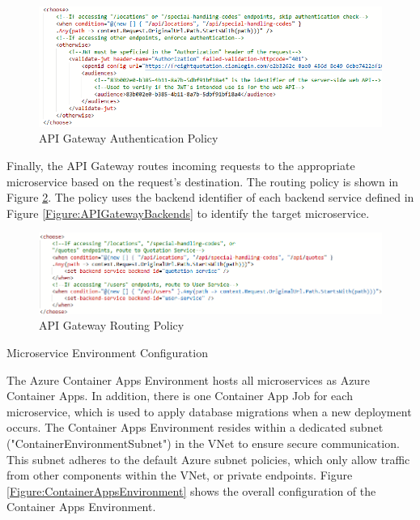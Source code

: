 \documentclass[12pt, reqno]{amsbook}
\makeatletter
\def\subsection{\@startsection{subsection}{2}%
      \z@{.5\linespacing\@plus.7\linespacing}{.25\linespacing}%
      {\normalfont\bfseries\flushleft}}
\theoremstyle{definition}
\theoremstyle{definition}
\numberwithin{section}{chapter}
\numberwithin{table}{chapter}
\numberwithin{figure}{chapter}
\makeatother
\begin{document}
\begin{figure}[H]
  \centering
  \includegraphics[width=1\linewidth]{images/APIGatewayConfigurationAuthentication.png}
  \caption{\label{Figure:APIGatewayConfigurationAuthentication}API Gateway Authentication Policy}
\end{figure}

Finally, the \ac{API} Gateway routes incoming requests to the appropriate microservice based on the request's destination. The routing policy is shown in Figure \ref{Figure:APIGatewayConfigurationRouting}. The policy uses the backend identifier of each backend service defined in Figure \ref{Figure:APIGatewayBackends} to identify the target microservice.

\begin{figure}[H]
  \centering
  \includegraphics[width=1\linewidth]{images/APIGatewayConfigurationRouting.png}
  \caption{\label{Figure:APIGatewayConfigurationRouting}API Gateway Routing Policy}
\end{figure}

\subsection{Microservice Environment Configuration}
\label{Subsection:Microservice_Environment_Configuration}

The Azure Container Apps Environment hosts all microservices as Azure Container Apps. In addition, there is one Container App Job for each microservice, which is used to apply database migrations when a new deployment occurs. The Container Apps Environment resides within a dedicated subnet ("ContainerEnvironmentSubnet") in the \ac{VNet} to ensure secure communication. This subnet adheres to the default Azure subnet policies, which only allow traffic from other components within the \ac{VNet}, or private endpoints. Figure \ref{Figure:ContainerAppsEnvironment} shows the overall configuration of the Container Apps Environment.
\end{document}
